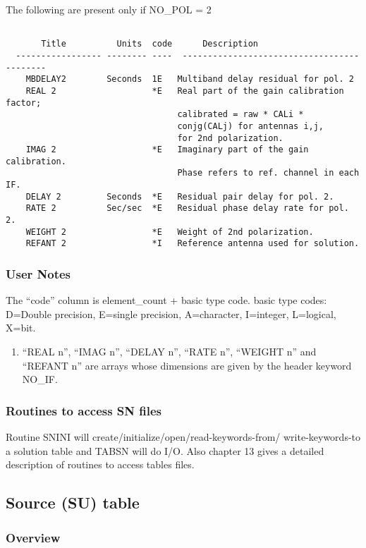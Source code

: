 The following are present only if NO\_POL = 2
\begin{verbatim}

       Title          Units  code      Description
  ----------------- -------- ----  -------------------------------------------
    MBDELAY2        Seconds  1E   Multiband delay residual for pol. 2
    REAL 2                   *E   Real part of the gain calibration factor;
                                  calibrated = raw * CALi *
                                  conjg(CALj) for antennas i,j,
                                  for 2nd polarization.
    IMAG 2                   *E   Imaginary part of the gain calibration.
                                  Phase refers to ref. channel in each IF.
    DELAY 2         Seconds  *E   Residual pair delay for pol. 2.
    RATE 2          Sec/sec  *E   Residual phase delay rate for pol. 2.
    WEIGHT 2                 *E   Weight of 2nd polarization.
    REFANT 2                 *I   Reference antenna used for solution.
\end{verbatim}

\subsubsection{User Notes}

  The ``code'' column is element\_count + basic type code.
basic type codes: D=Double precision, E=single precision, A=character,
I=integer, L=logical, X=bit.
\begin{enumerate}
\item  ``REAL n'', ``IMAG n'', ``DELAY n'', ``RATE n'',
``WEIGHT n'' and ``REFANT n'' are arrays whose dimensions are given by
the header keyword NO\_IF.
\end{enumerate}

\subsubsection{Routines to access SN files}
     Routine SNINI will
create/initialize/open/read-keywords-from/ write-keywords-to a
solution table and TABSN will do I/O.  Also chapter 13
gives a detailed description of routines to access tables files.

\subsection{Source (SU) table }
\subsubsection{Overview}

